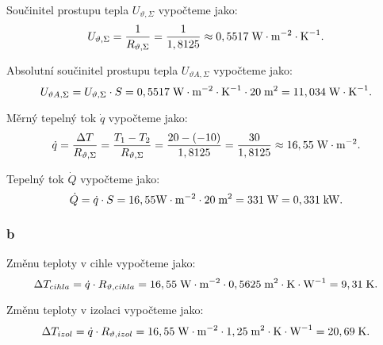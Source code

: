 \documentclass{article}
\begin{document}
Součinitel prostupu tepla $U_{\vartheta,\Sigma}$ vypočteme jako:
$$
    U_{\vartheta,\Sigma} = \frac{1}{R_{\vartheta,\Sigma}} = \frac{1}{1,8125} \approx 0,5517 \; \textrm{W} \cdot \textrm{m}^{-2} \cdot \textrm{K}^{-1}.
$$

Absolutní součinitel prostupu tepla $U_{\vartheta A,\Sigma}$ vypočteme jako:
$$
    U_{\vartheta A,\Sigma} = U_{\vartheta,\Sigma} \cdot S = 0,5517 \; \textrm{W} \cdot \textrm{m}^{-2} \cdot \textrm{K}^{-1} \cdot 20 \; \textrm{m}^{\textrm{2}} = 11,034 \; \textrm{W} \cdot \textrm{K}^{-1}.
$$

Měrný tepelný tok $\dot{q}$ vypočteme jako:
$$
    \dot{q} = \frac{\Delta T}{R_{\vartheta,\Sigma}} = \frac{T_1 - T_2}{R_{\vartheta,\Sigma}} = \frac{20 - (-10)}{1,8125} = \frac{30}{1,8125} \approx 16,55 \; \textrm{W} \cdot \textrm{m}^{-2}.
$$

Tepelný tok $\dot{Q}$ vypočteme jako:
$$
    \dot{Q} = \dot{q} \cdot S = 16,55 \textrm{W} \cdot \textrm{m}^{-2} \cdot 20 \; \textrm{m}^{\textrm{2}} = 331 \; \textrm{W} = 0,331 \; \textrm{kW}.
$$


\subsubsection{b}
Změnu teploty v cihle vypočteme jako:
$$
    \Delta T_{cihla} = \dot{q} \cdot R_{\vartheta,cihla} = 16,55 \; \textrm{W} \cdot \textrm{m}^{-2} \cdot 0,5625 \; \textrm{m}^{\textrm{2}} \cdot \textrm{K} \cdot \textrm{W}^{-1} = 9,31 \; \textrm{K}.
$$

Změnu teploty v izolaci vypočteme jako:
$$
    \Delta T_{izol} = \dot{q} \cdot R_{\vartheta,izol} = 16,55 \; \textrm{W} \cdot \textrm{m}^{-2} \cdot 1,25 \; \textrm{m}^{\textrm{2}} \cdot \textrm{K} \cdot \textrm{W}^{-1} = 20,69 \; \textrm{K}.
$$
\end{document}

